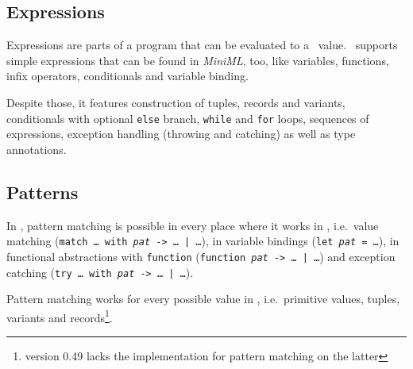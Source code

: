 \subsection*{Expressions}

Expressions are parts of a program that can be evaluated to a \ocaml\ value.
\easyocaml\ supports simple expressions that can be found in \textsl{MiniML},
too, like variables, functions, infix operators, conditionals and variable
binding.

Despite those, it features construction of tuples, records and variants,
conditionals with optional \texttt{else} branch, \texttt{while} and
\texttt{for} loops, sequences of expressions, exception handling (throwing and
catching) as well as type annotations.

\subsection*{Patterns}

In \easyocaml, pattern matching is possible in every place where it works in
\ocaml, i.e.\ value matching (\texttt{match \ldots\ with \emph{pat} -> \ldots\ |
\ldots}), in variable bindings (\texttt{let \emph{pat} = \ldots}), in
functional abstractions with \texttt{function} (\texttt{function \emph{pat} -> \ldots\ |
\ldots}) and exception catching (\texttt{try \ldots\ with \emph{pat} -> \ldots\ | \ldots}).

Pattern matching works for every possible value in \easyocaml, i.e.\ primitive values,
tuples, variants and records\footnote{version 0.49 lacks the implementation for pattern matching on the latter}.
